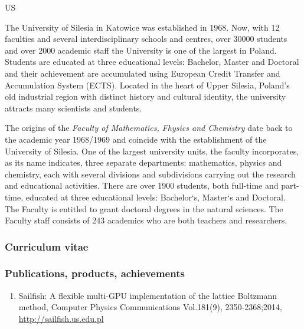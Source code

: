 \begin{sitedescription}{US}

The University of Silesia in Katowice was established in 1968. Now,
with 12 faculties and several interdisciplinary schools and centres,
over 30000 students and over 2000 academic staff the University is one
of the largest in Poland. Students are educated at three educational
levels: Bachelor, Master and Doctoral and their achievement are
accumulated using European Credit Transfer and Accumulation System
(ECTS). Located in the heart of Upper Silesia, Poland's old industrial
region with distinct history and cultural identity, the university
attracts many scientists and students.

The origins of the {\em Faculty of Mathematics, Fhysics and Chemistry} date
back to the academic year 1968/1969 and coincide with the
establishment of the University of Silesia. One of the largest
university units, the faculty incorporates, as its name indicates,
three separate departments: mathematics, physics and chemistry, each
with several divisions and subdivisions carrying out the research and
educational activities. There are over 1900 students, both full-time
and part-time, educated at three educational levels: Bachelor`s,
Master`s and Doctoral. The Faculty is entitled to grant doctoral
degrees in the natural sciences. The Faculty staff consists of 243
academics who are both teachers and researchers.

\subsubsection*{Curriculum vitae}





%
%

\subsubsection*{Publications, products, achievements}


\begin{enumerate}

\item Sailfish: A flexible multi-GPU implementation of the lattice Boltzmann method,
 Computer Physics Communications Vol.181(9), 2350-2368;2014,
 \url{http://sailfish.us.edu.pl} 


\end{enumerate}
\end{sitedescription}
